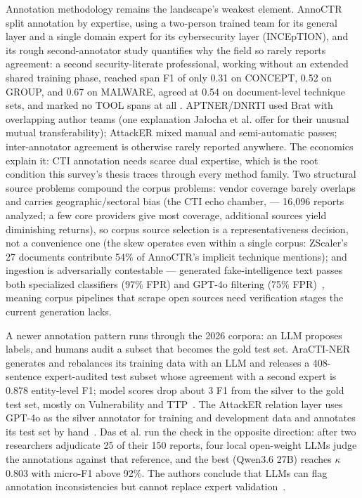 \documentclass[11pt]{article}
\begin{document}
Annotation methodology remains the landscape's weakest element. AnnoCTR split annotation by expertise, using a two-person trained team for its general layer and a single domain expert for its cybersecurity layer (INCEpTION), and its rough second-annotator study quantifies why the field so rarely reports agreement: a second security-literate professional, working without an extended shared training phase, reached span F1 of only 0.31 on CONCEPT, 0.52 on GROUP, and 0.67 on MALWARE, agreed at 0.54 on document-level technique sets, and marked no TOOL spans at all \citep{lange2024annoctr}. APTNER/DNRTI used Brat with overlapping author teams (one explanation Ja\l{}ocha et al. offer for their unusual mutual transferability); AttackER mixed manual and semi-automatic passes; inter-annotator agreement is otherwise rarely reported anywhere. The economics explain it: CTI annotation needs scarce dual expertise, which is the root condition this survey's thesis traces through every method family. Two structural source problems compound the corpus problems: vendor coverage barely overlaps and carries geographic/sectoral bias (the CTI echo chamber, \citealp{suarezroman2026cti} — 16,096 reports analyzed; a few core providers give most coverage, additional sources yield diminishing returns), so corpus source selection is a representativeness decision, not a convenience one (the skew operates even within a single corpus: ZScaler's 27 documents contribute 54\% of AnnoCTR's implicit technique mentions); and ingestion is adversarially contestable — generated fake-intelligence text passes both specialized classifiers (97\% FPR) and GPT-4o filtering (75\% FPR)~\citep{shafee2025false}, meaning corpus pipelines that scrape open sources need verification stages the current generation lacks.

A newer annotation pattern runs through the 2026 corpora: an LLM proposes labels, and humans audit a subset that becomes the gold test set. AraCTI-NER generates and rebalances its training data with an LLM and releases a 408-sentence expert-audited test subset whose agreement with a second expert is 0.878 entity-level F1; model scores drop about 3 F1 from the silver to the gold test set, mostly on Vulnerability and TTP~\citep{alghamdi2026aracti}. The AttackER relation layer uses GPT-4o as the silver annotator for training and development data and annotates its test set by hand~\citep{oyenuga2026relation}. Das et al. run the check in the opposite direction: after two researchers adjudicate 25 of their 150 reports, four local open-weight LLMs judge the annotations against that reference, and the best (Qwen3.6 27B) reaches $\kappa$ 0.803 with micro-F1 above 92\%. The authors conclude that LLMs can flag annotation inconsistencies but cannot replace expert validation~\citep{das2026structuring}.
\end{document}
